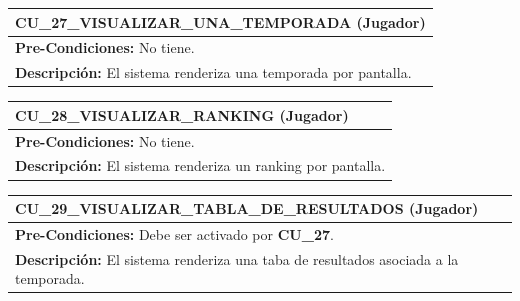 \begin{center}
  \begin{tabular}{| p{7.5cm} | p{7.5cm} |}
    \hline
    \multicolumn{2}{|p{15cm}|}{\textbf{CU\_27\_VISUALIZAR\_UNA\_TEMPORADA} (Jugador)} \\ \hline
    \multicolumn{2}{|p{15cm}|}{\textbf{Pre-Condiciones:} No tiene.} \\ \hline
    \multicolumn{2}{|p{15cm}|}{\textbf{Descripción:} El sistema renderiza una temporada por pantalla.} \\
    \hline
  \end{tabular}
\end{center}

\begin{center}
  \begin{tabular}{| p{7.5cm} | p{7.5cm} |}
    \hline
    \multicolumn{2}{|p{15cm}|}{\textbf{CU\_28\_VISUALIZAR\_RANKING} (Jugador)} \\ \hline
    \multicolumn{2}{|p{15cm}|}{\textbf{Pre-Condiciones:} No tiene.} \\ \hline
    \multicolumn{2}{|p{15cm}|}{\textbf{Descripción:} El sistema renderiza un ranking por pantalla.} \\
    \hline
  \end{tabular}
\end{center}

\begin{center}
  \begin{tabular}{| p{7.5cm} | p{7.5cm} |}
    \hline
    \multicolumn{2}{|p{15cm}|}{\textbf{CU\_29\_VISUALIZAR\_TABLA\_DE\_RESULTADOS} (Jugador)} \\ \hline
    \multicolumn{2}{|p{15cm}|}{\textbf{Pre-Condiciones:} Debe ser activado por \textbf{CU\_27}.} \\ \hline
    \multicolumn{2}{|p{15cm}|}{\textbf{Descripción:} El sistema renderiza una taba de resultados asociada a la temporada.} \\
    \hline
  \end{tabular}
\end{center}


